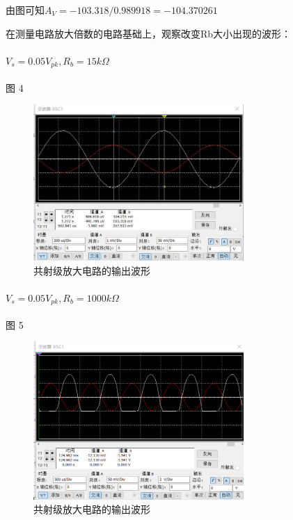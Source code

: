 \documentclass[10pt, conference, compsocconf, a4paper]{IEEEtran}
\begin{document}
由图可知$A_V = -103.318 / 0.989918 = -104.370261$ \par
在测量电路放大倍数的电路基础上，观察改变Rb大小出现的波形：\par

\paragraph{$V_s = 0.05V_{pk} , R_b = 15k\Omega$}图 4

\begin{figure}[H]%
  \includegraphics[width=8cm]{img/c.png}
  \caption{共射级放大电路的输出波形}
\end{figure}


\paragraph{$V_{s} = 0.05V_{pk} , R_b = 1000k\Omega$}图 5

\begin{figure}[H]
  \includegraphics[width=8cm]{img/d.png}
  \caption{共射级放大电路的输出波形}
\end{figure}
\end{document}
